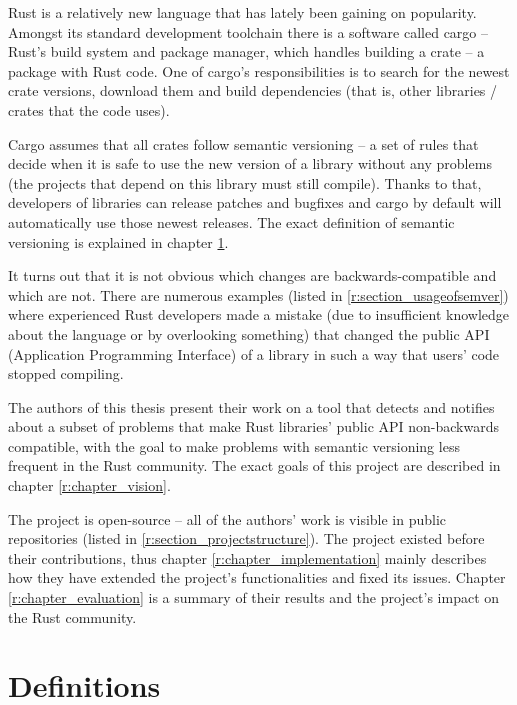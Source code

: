 \documentclass[licencjacka,en]{pracamgr}
\begin{document}
Rust is a relatively new language that has lately been gaining on popularity.
Amongst its standard development toolchain there is a software called cargo
-- Rust's build system and package manager,
which handles building a crate -- a package with Rust code.
One of cargo's responsibilities is to search for the newest crate versions,
download them and build dependencies
(that is, other libraries / crates that the code uses).

Cargo assumes that all crates follow semantic versioning
-- a set of rules that decide when it is safe to use the new version of a library
without any problems (the projects that depend on this library must still compile).
Thanks to that, developers of libraries can release patches and bugfixes
and cargo by default will automatically use those newest releases.
The exact definition of semantic versioning is explained in chapter \ref{r:chapter_definitions}.

It turns out that it is not obvious which changes are backwards-compatible
and which are not. There are numerous examples (listed in \ref{r:section_usageofsemver})
where experienced Rust developers made a mistake
(due to insufficient knowledge about the language or by overlooking something)
that changed the public API (Application Programming Interface) of a library in such a way that
users' code stopped compiling.

The authors of this thesis present their work on a tool that detects and notifies about
a subset of problems that make Rust libraries' public API non-backwards compatible,
with the goal to make problems with semantic versioning less frequent in the Rust community.
The exact goals of this project are described in chapter \ref{r:chapter_vision}.

The project is open-source -- all of the authors' work is visible in public repositories
(listed in \ref{r:section_projectstructure}). The project existed before their contributions,
thus chapter \ref{r:chapter_implementation} mainly describes how they have
extended the project's functionalities and fixed its issues.
Chapter \ref{r:chapter_evaluation} is a summary of their results and the project's impact
on the Rust community.


\chapter{Definitions}\label{r:chapter_definitions}
\end{document}
